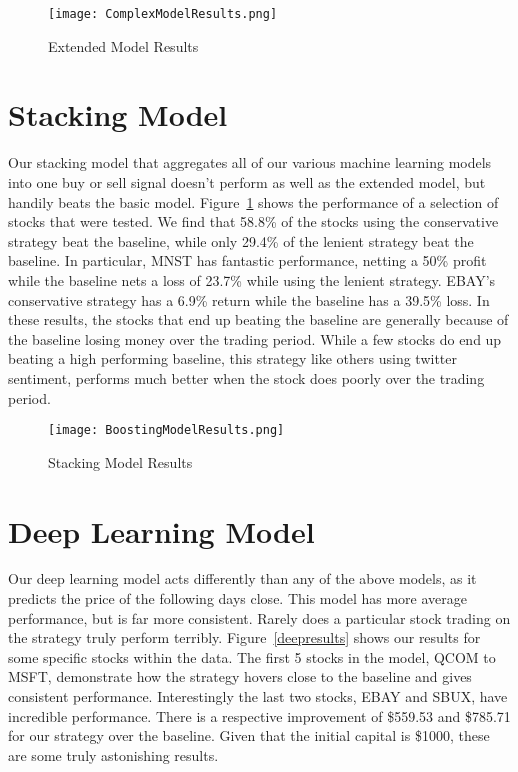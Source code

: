 \documentclass[../thesis.tex]{subfiles}
\begin{document}
\begin{figure}[h]
\centering
\texttt{[image: ComplexModelResults.png]}
\caption{Extended Model Results \label{overflow}}
\label{complexresults}
\end{figure}

\section{Stacking Model}
Our stacking model that aggregates all of our various machine learning models into one buy or sell signal doesn't perform as well as the extended model, but handily beats the basic model. Figure~\ref{complexresults} shows the performance of a selection of stocks that were tested. We find that 58.8\% of the stocks using the conservative strategy beat the baseline, while only 29.4\% of the lenient strategy beat the baseline. In particular, MNST has fantastic performance, netting a 50\% profit while the baseline nets a loss of 23.7\% while using the lenient strategy. EBAY's conservative strategy has a 6.9\% return while the baseline has a 39.5\% loss. In these results, the stocks that end up beating the baseline are generally because of the baseline losing money over the trading period. While a few stocks do end up beating a high performing baseline, this strategy like others using twitter sentiment, performs much better when the stock does poorly over the trading period. 

\begin{figure}[h]
\centering
\texttt{[image: BoostingModelResults.png]}
\caption{Stacking Model Results \label{overflow}}
\label{stackingresults}
\end{figure}

\section{Deep Learning Model}
Our deep learning model acts differently than any of the above models, as it predicts the price of the following days close. This model has more average performance, but is far more consistent. Rarely does a particular stock trading on the strategy truly perform terribly. Figure~\ref{deepresults} shows our results for some specific stocks within the data. The first 5 stocks in the model, QCOM to MSFT, demonstrate how the strategy hovers close to the baseline and gives consistent performance. Interestingly the last two stocks, EBAY and SBUX, have incredible performance. There is a respective improvement of \$559.53 and \$785.71 for our strategy over the baseline. Given that the initial capital is \$1000, these are some truly astonishing results. 
\end{document}
